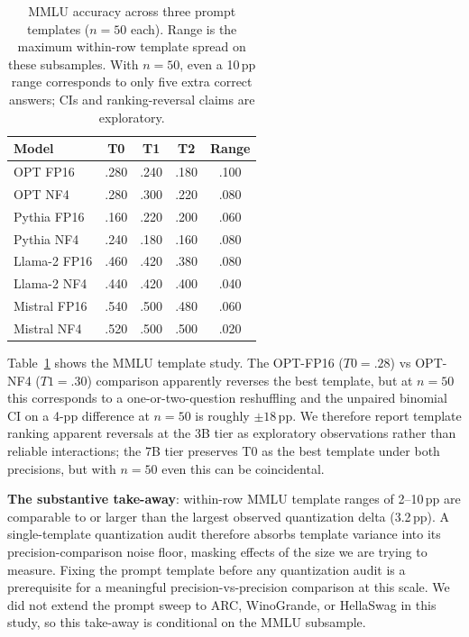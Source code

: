 \documentclass{article}
\begin{document}
\begin{table}[t]
\caption{MMLU accuracy across three prompt templates ($n{=}50$ each). Range is the maximum within-row template spread on these subsamples. With $n{=}50$, even a 10\,pp range corresponds to only five extra correct answers; CIs and ranking-reversal claims are exploratory.}
\label{tab:prompt}
\centering
\small
\begin{tabular}{lcccc}
\toprule
Model & T0 & T1 & T2 & Range \\
\midrule
OPT FP16   & .280 & .240 & .180 & .100 \\
OPT NF4    & .280 & .300 & .220 & .080 \\
\midrule
Pythia FP16  & .160 & .220 & .200 & .060 \\
Pythia NF4   & .240 & .180 & .160 & .080 \\
\midrule
Llama-2 FP16 & .460 & .420 & .380 & .080 \\
Llama-2 NF4  & .440 & .420 & .400 & .040 \\
\midrule
Mistral FP16 & .540 & .500 & .480 & .060 \\
Mistral NF4  & .520 & .500 & .500 & .020 \\
\bottomrule
\end{tabular}
\end{table}

Table~\ref{tab:prompt} shows the MMLU template study. The OPT-FP16 ($T0{=}.28$) vs OPT-NF4 ($T1{=}.30$) comparison apparently reverses the best template, but at $n{=}50$ this corresponds to a one-or-two-question reshuffling and the unpaired binomial CI on a 4-pp difference at $n{=}50$ is roughly $\pm 18$\,pp. We therefore report template ranking apparent reversals at the 3B tier as exploratory observations rather than reliable interactions; the 7B tier preserves T0 as the best template under both precisions, but with $n{=}50$ even this can be coincidental.

\textbf{The substantive take-away}: within-row MMLU template ranges of 2--10\,pp are comparable to or larger than the largest observed quantization delta (3.2\,pp). A single-template quantization audit therefore absorbs template variance into its precision-comparison noise floor, masking effects of the size we are trying to measure. Fixing the prompt template before any quantization audit is a prerequisite for a meaningful precision-vs-precision comparison at this scale. We did not extend the prompt sweep to ARC, WinoGrande, or HellaSwag in this study, so this take-away is conditional on the MMLU subsample.
\end{document}
